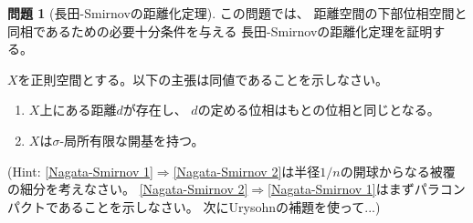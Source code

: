 \documentclass[uplatex]{jsarticle}
\theoremstyle{definition}
\newtheorem{prob}[prob]{問題}
\begin{document}
\begin{prob}[長田-Smirnovの距離化定理]
  この問題では、
  距離空間の下部位相空間と同相であるための必要十分条件を与える
  長田-Smirnovの距離化定理を証明する。

  \(X\)を正則空間とする。以下の主張は同値であることを示しなさい。
  \begin{enumerate}
    \item \label{Nagata-Smirnov 1}
    \(X\)上にある距離\(d\)が存在し、
    \(d\)の定める位相はもとの位相と同じとなる。
    \item \label{Nagata-Smirnov 2}
    \(X\)は\(\sigma\)-局所有限な開基を持つ。
  \end{enumerate}
  (Hint: \ref{Nagata-Smirnov 1}\(\Rightarrow\)\ref{Nagata-Smirnov 2}は半径\(1/n\)の開球からなる被覆の細分を考えなさい。
  \ref{Nagata-Smirnov 2}\(\Rightarrow\)\ref{Nagata-Smirnov 1}はまずパラコンパクトであることを示しなさい。
  次にUrysohnの補題を使って...)
\end{prob}
\end{document}

